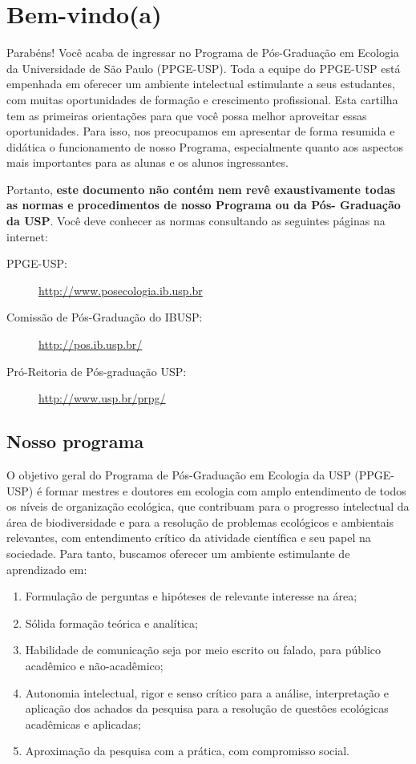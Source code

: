 \chapter{Bem-vindo(a)}
\label{chap:aprest}

Parabéns! Você acaba de ingressar no Programa de Pós-Graduação em
Ecologia da Universidade de São Paulo (PPGE-USP). Toda a equipe do
PPGE-USP está empenhada em oferecer um ambiente intelectual
estimulante a seus estudantes, com muitas oportunidades de formação e
crescimento profissional. Esta cartilha tem as primeiras orientações
para que você possa melhor aproveitar essas oportunidades. Para isso,
nos preocupamos em apresentar de forma resumida e didática o
funcionamento de nosso Programa, especialmente quanto aos aspectos
mais importantes para as alunas e os alunos ingressantes.

Portanto, \textbf{este documento não contém nem revê exaustivamente
todas as normas e procedimentos de nosso Programa ou da Pós- Graduação
da USP}. Você deve conhecer as normas consultando as seguintes páginas
na internet:

\begin{description}
\item[PPGE-USP:] \url{http://www.posecologia.ib.usp.br}
\item[Comissão de Pós-Graduação do IBUSP:] \url{http://pos.ib.usp.br/}
\item[Pró-Reitoria de Pós-graduação USP:] \url{http://www.usp.br/prpg/}
\end{description}


\section{Nosso  programa}

O objetivo geral do Programa de Pós-Graduação em Ecologia da USP
(PPGE-USP) é formar mestres e doutores em ecologia com amplo
entendimento de todos os níveis de organização ecológica, que
contribuam para o progresso intelectual da área de biodiversidade e
para a resolução de problemas ecológicos e ambientais relevantes, com
entendimento crítico da atividade científica e seu papel na sociedade.
Para tanto, buscamos oferecer um ambiente estimulante de aprendizado
em:

\begin{enumerate}
\item Formulação de perguntas e hipóteses de relevante interesse na área;
\item Sólida formação teórica e analítica;
\item Habilidade de comunicação seja por meio escrito ou falado, para
  público acadêmico e não-acadêmico;
\item Autonomia intelectual, rigor e senso crítico para a análise,
  interpretação e aplicação dos achados da pesquisa para a resolução
  de questões ecológicas acadêmicas e aplicadas;
\item Aproximação da pesquisa com a prática, com compromisso social.
\end{enumerate}

